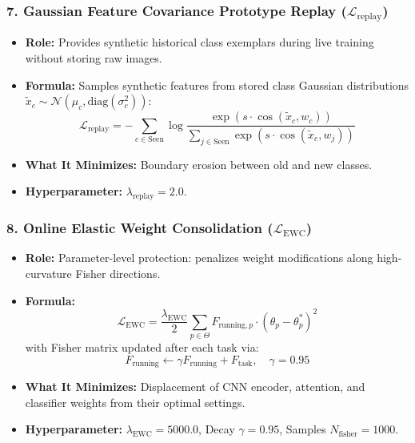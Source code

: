\documentclass[11pt,a4paper]{article}
\begin{document}
    \subsubsection{7. Gaussian Feature Covariance Prototype Replay ($\mathcal{L}_{\text{replay}}$)}
    \begin{itemize}[leftmargin=*]
        \item \textbf{Role:} Provides synthetic historical class exemplars during live training without storing raw images.
        \item \textbf{Formula:} Samples synthetic features from stored class Gaussian distributions $\tilde{x}_c \sim \mathcal{N}(\mu_c, \text{diag}(\sigma_c^2))$:
        \begin{equation}
            \mathcal{L}_{\text{replay}} = - \sum_{c \in \text{Seen}} \log \frac{\exp(s \cdot \cos(\tilde{x}_c, w_c))}{\sum_{j \in \text{Seen}} \exp(s \cdot \cos(\tilde{x}_c, w_j))}
        \end{equation}
        \item \textbf{What It Minimizes:} Boundary erosion between old and new classes.
        \item \textbf{Hyperparameter:} $\lambda_{\text{replay}} = 2.0$.
    \end{itemize}

    \subsubsection{8. Online Elastic Weight Consolidation ($\mathcal{L}_{\text{EWC}}$)}
    \begin{itemize}[leftmargin=*]
        \item \textbf{Role:} Parameter-level protection: penalizes weight modifications along high-curvature Fisher directions.
        \item \textbf{Formula:}
        \begin{equation}
            \mathcal{L}_{\text{EWC}} = \frac{\lambda_{\text{EWC}}}{2} \sum_{p \in \Theta} F_{\text{running}, p} \cdot \left( \theta_p - \theta_p^* \right)^2
        \end{equation}
        with Fisher matrix updated after each task via:
        \begin{equation}
            F_{\text{running}} \leftarrow \gamma F_{\text{running}} + F_{\text{task}}, \quad \gamma = 0.95
        \end{equation}
        \item \textbf{What It Minimizes:} Displacement of CNN encoder, attention, and classifier weights from their optimal settings.
        \item \textbf{Hyperparameter:} $\lambda_{\text{EWC}} = 5000.0$, Decay $\gamma = 0.95$, Samples $N_{\text{fisher}} = 1000$.
    \end{itemize}
\end{document}
